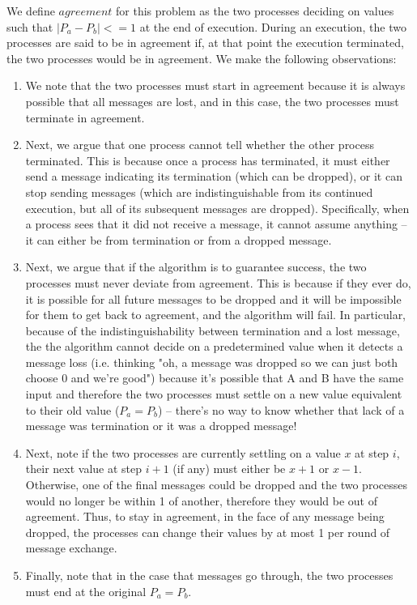 \documentclass{article}
\begin{document}
We define $agreement$ for this problem as the two processes deciding on values such that $|P_a - P_b|<=1$ at the end of execution. During an execution, the two processes are said to be in agreement if,
at that point the execution terminated, the two processes would be in agreement. We make the following observations:
\begin{enumerate}

\item We note that the two processes must start in agreement because it is always possible that all messages are lost, and in this case, the two processes must terminate in agreement.

\item Next, we argue that one process cannot tell whether the other process terminated. This is because once a process has terminated, it must either send a message indicating its
termination (which can be dropped), or it can stop sending messages (which are indistinguishable from its continued execution, but all of its subsequent messages are dropped).
Specifically, when a process sees that it did not receive a message, it cannot assume anything -- it can either be from termination or from a dropped message.

\item Next, we argue that if the algorithm is to guarantee success, the two processes must never deviate from agreement. This is because if they ever do, it is possible for all future
messages to be dropped and it will be impossible for them to get back to agreement, and the algorithm will fail. In particular, because of the indistinguishability between termination and a lost message, the
the algorithm cannot decide on a predetermined value when it detects a message loss (i.e. thinking "oh, a message was dropped so we can just both choose 0 and we're good") because
it's possible that A and B have the same input and therefore the two processes must settle on a new value equivalent to their old value ($P_a = P_b$) -- there's no way to know
whether that lack of a message was termination or it was a dropped message!

\item Next, note if the two processes are currently settling on a value $x$ at step $i$, their next value at step $i+1$ (if any) must either be $x+1$ or $x-1$. Otherwise, one of the
final messages could be dropped and the two processes would no longer be within 1 of another, therefore they would be out of agreement.  Thus, to stay in agreement, in the face of
any message being dropped, the processes can change their values by at most 1 per round of message exchange.

\item Finally, note that in the case that messages go through, the two processes must end at the original $P_a = P_b$.
\end{enumerate}
\end{document}
